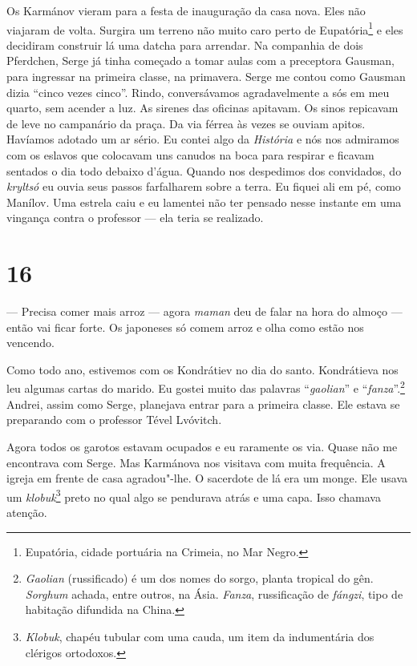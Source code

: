 Os Karmánov vieram para a festa de inauguração da casa nova. Eles não
viajaram de volta. Surgira um terreno não muito caro perto de
Eupatória\footnote{Eupatória, cidade portuária na Crimeia, no Mar Negro.}
e eles decidiram construir lá uma datcha para arrendar. Na companhia de
dois Pferdchen, Serge já tinha começado a tomar aulas com a preceptora
Gausman, para ingressar na primeira classe, na primavera. Serge me
contou como Gausman dizia ``cinco vezes cinco''. Rindo, conversávamos
agradavelmente a sós em meu quarto, sem acender a luz. As sirenes das
oficinas apitavam. Os sinos repicavam de leve no campanário da praça. Da
via férrea às vezes se ouviam apitos. Havíamos adotado um ar sério. Eu
contei algo da \emph{História} e nós nos admiramos com os eslavos que
colocavam uns canudos na boca para respirar e ficavam sentados o dia
todo debaixo d'água. Quando nos despedimos dos convidados, do
\emph{kryltsó} eu ouvia seus passos farfalharem sobre a terra. Eu fiquei
ali em pé, como Manílov. Uma estrela caiu e eu lamentei não ter pensado
nesse instante em uma vingança contra o professor --- ela teria se
realizado.

\section{16}

--- Precisa comer mais arroz --- agora \emph{maman} deu de falar na hora
do almoço --- então vai ficar forte. Os japoneses só comem arroz e olha
como estão nos vencendo.

Como todo ano, estivemos com os Kondrátiev no dia do santo. Kondrátieva
nos leu algumas cartas do marido. Eu gostei muito das palavras
``\emph{gaolian}'' e ``\emph{fanza}''.\footnote{\emph{Gaolian}
  (russificado) é um dos nomes do sorgo, planta tropical do gên.
  \emph{Sorghum} achada, entre outros, na Ásia. \emph{Fanza},
  russificação de \emph{fángzi}, tipo de habitação difundida na China.}
Andrei, assim como Serge, planejava entrar para a primeira classe. Ele
estava se preparando com o professor Tével Lvóvitch.

Agora todos os garotos estavam ocupados e eu raramente os via. Quase não
me encontrava com Serge. Mas Karmánova nos visitava com muita
frequência. A igreja em frente de casa agradou"-lhe. O sacerdote de lá
era um monge. Ele usava um \emph{klobuk}\footnote{\emph{Klobuk}, chapéu
  tubular com uma cauda, um item da indumentária dos clérigos ortodoxos.}
preto no qual algo se pendurava atrás e uma capa. Isso chamava atenção.

